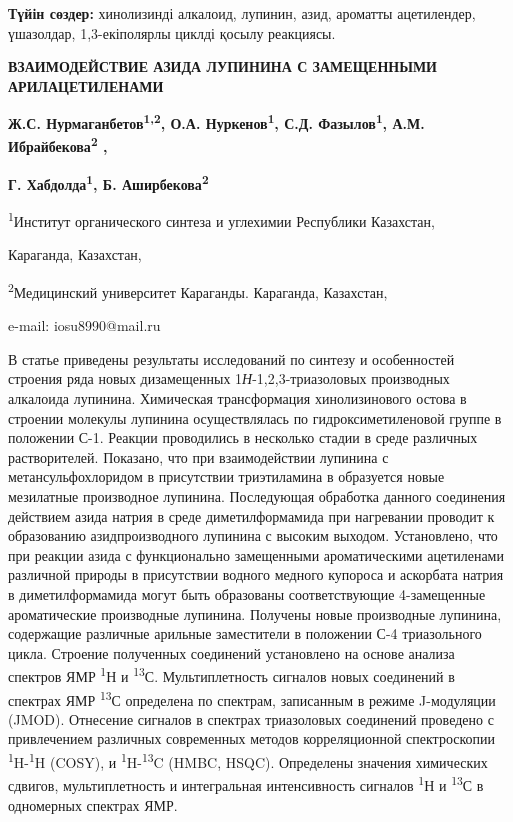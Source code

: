 {\bfseries Түйін сөздер:} хинолизинді алкалоид, лупинин, азид, ароматты
ацетилендер, үшазолдар, 1,3-екіполярлы циклді қосылу реакциясы.

\begin{center}
{\large\bfseries ВЗАИМОДЕЙСТВИЕ АЗИДА ЛУПИНИНА С ЗАМЕЩЕННЫМИ АРИЛАЦЕТИЛЕНАМИ}

{\bfseries Ж.С. Нурмаганбетов\textsuperscript{1,2}, О.А.
Нуркенов\textsuperscript{1}, С.Д. Фазылов\textsuperscript{1}, А.М.
Ибрайбекова\textsuperscript{2} ,}

{\bfseries Г. Хабдолда\textsuperscript{1}, Б.
Аширбекова\textsuperscript{2}}

\textsuperscript{1}Институт органического синтеза и углехимии Республики
Казахстан,

Караганда, Казахстан,

\textsuperscript{2}Медицинский университет Караганды. Караганда,
Казахстан,

e-mail: iosu8990@mail.ru
\end{center}

В статье приведены результаты исследований по синтезу и особенностей
строения ряда новых дизамещенных 1\emph{Н}-1,2,3-триазоловых производных
алкалоида лупинина. Химическая трансформация хинолизинового остова в
строении молекулы лупинина осуществлялась по гидроксиметиленовой группе
в положении С-1. Реакции проводились в несколько стадии в среде
различных растворителей. Показано, что при взаимодействии лупинина с
метансульфохлоридом в присутствии триэтиламина в образуется новые
мезилатные производное лупинина. Последующая обработка данного
соединения действием азида натрия в среде диметилформамида при
нагревании проводит к образованию азидпроизводного лупинина с высоким
выходом. Установлено, что при реакции азида с функционально замещенными
ароматическими ацетиленами различной природы в присутствии водного
медного купороса и аскорбата натрия в диметилформамида могут быть
образованы соответствующие 4-замещенные ароматические производные
лупинина. Получены новые производные лупинина, содержащие различные
арильные заместители в положении С-4 триазольного цикла. Строение
полученных соединений установлено на основе анализа спектров ЯМР
\textsuperscript{1}Н и \textsuperscript{13}С. Мультиплетность сигналов
новых соединений в спектрах ЯМР \textsuperscript{13}С определена по
спектрам, записанным в режиме J-модуляции (JMOD). Отнесение сигналов в
спектрах триазоловых соединений проведено с привлечением различных
современных методов корреляционной спектроскопии
\textsuperscript{1}H-\textsuperscript{1}H (COSY), и
\textsuperscript{1}H-\textsuperscript{13}C (HMBC, HSQC). Определены
значения химических сдвигов, мультиплетность и интегральная
интенсивность сигналов \textsuperscript{1}Н и \textsuperscript{13}С в
одномерных спектрах ЯМР.

